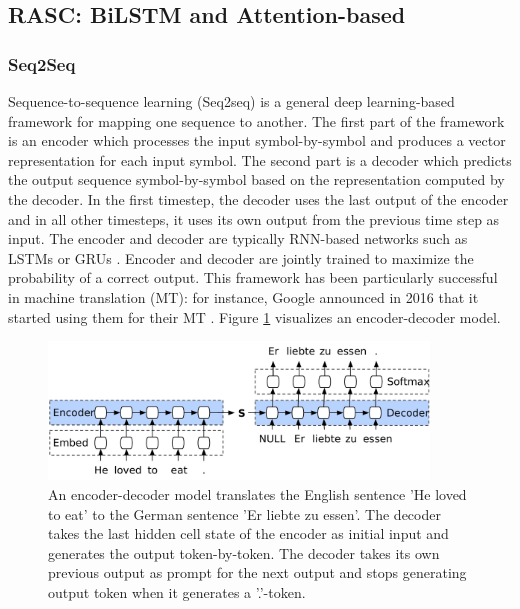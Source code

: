 \subsection{RASC: BiLSTM and Attention-based} \label{subsec:bilstm}

\subsubsection{Seq2Seq} \label{subsubsec:seq2seq}
Sequence-to-sequence learning (Seq2seq) \cite{seq2seq} is a general deep learning-based framework for mapping one sequence to another. The first part of the framework is an encoder which processes the input symbol-by-symbol and produces a vector representation for each input symbol. The second part is a decoder which predicts the output sequence symbol-by-symbol based on the representation computed by the decoder. In the first timestep, the decoder uses the last output of the encoder and in all other timesteps, it uses its own output from the previous time step as input. The encoder and decoder are typically RNN-based networks such as LSTMs \cite{lstm} or GRUs \cite{gru}. Encoder and decoder are jointly trained to maximize the probability of a correct output. This framework has been particularly successful in machine translation (MT): for instance, Google announced in 2016 that it started using them for their MT \cite{googlemt2016}. Figure \ref{fig:encdec} visualizes an encoder-decoder model.

\begin{figure}
	\centering\includegraphics[width=0.9\textwidth]{../visualizations/ch4-methods/enc_dec.pdf} 
	\caption{An encoder-decoder model \cite{ruderencdecgraphic} translates the English sentence 'He loved to eat' to the German sentence 'Er liebte zu essen'. The decoder takes the last hidden cell state of the encoder as initial input and generates the output token-by-token. The decoder takes its own previous output as prompt for the next output and stops generating output token when it generates a '.'-token. }
	\label{fig:encdec}
\end{figure}

